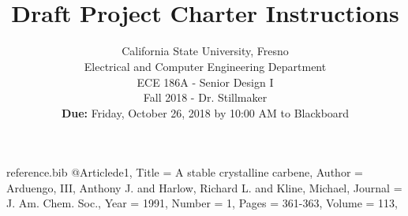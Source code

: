 %
\RequirePackage{filecontents}
\begin{filecontents*}{reference.bib}
	@Article{de1,
		Title                    = {A stable crystalline carbene},
		Author                   = 
		{Arduengo, III, Anthony J. and Harlow, Richard L. and Kline, Michael},
		Journal                  = {J. Am. Chem. Soc.},
		Year                     = {1991},
		Number                   = {1},
		Pages                    = {361-363},
		Volume                   = {113},
	}
\end{filecontents*}



\documentclass[12pt,onecolumn]{IEEEtran}			%
\usepackage{dtk-logos}						%
\usepackage{graphics}
\usepackage{float}
\usepackage{caption} 

\title{ \hfill  \vspace{2in} \\Draft Project Charter Instructions \vspace{1in} }	%
\author{California State University, Fresno \\
Electrical and Computer Engineering Department \\
ECE 186A - Senior Design I \\ 					%
Fall 2018 - Dr. Stillmaker \\ 					%
\vspace{12pt} 								%
\textbf{Due:} Friday, October 26, 2018 by 10:00 AM to Blackboard \\ 
\vspace{2in}								%


\vspace{4in}}								%




